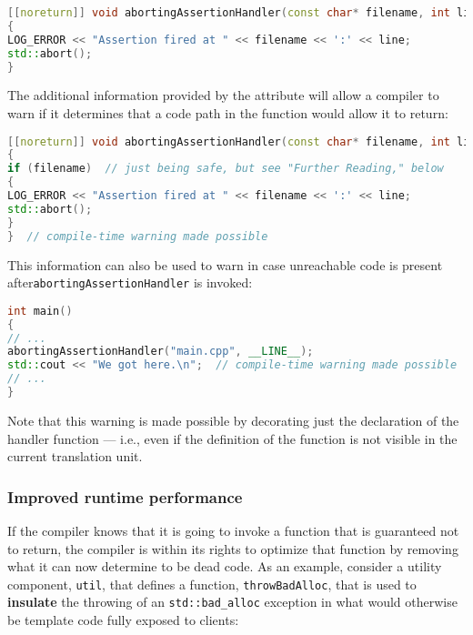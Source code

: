 \begin{lstlisting}[language=C++]
[[noreturn]] void abortingAssertionHandler(const char* filename, int line)
{
LOG_ERROR << "Assertion fired at " << filename << ':' << line;
std::abort();
}
\end{lstlisting}


\noindent The additional information provided by the attribute will allow a
compiler to warn if it determines that a code path in the
function would allow it to return:

\begin{lstlisting}[language=C++]
[[noreturn]] void abortingAssertionHandler(const char* filename, int line)
{
if (filename)  // just being safe, but see "Further Reading," below
{
LOG_ERROR << "Assertion fired at " << filename << ':' << line;
std::abort();
}
}  // compile-time warning made possible
\end{lstlisting}


\noindent This information can also be used to warn in case unreachable code is
present after\linebreak[4] \texttt{abortingAssertionHandler} is invoked:

\begin{lstlisting}[language=C++]
int main()
{
// ...
abortingAssertionHandler("main.cpp", __LINE__);
std::cout << "We got here.\n";  // compile-time warning made possible
// ...
}
\end{lstlisting}


\noindent Note that this warning is made possible by decorating just the
declaration of the handler function --- i.e., even if the definition of
the function is not visible in the current translation unit.

\subsubsection[Improved runtime performance]{Improved runtime performance}\label{improved-runtime-performance}

If the compiler knows that it is going to invoke a function
that is guaranteed not to return, the compiler is within its rights to optimize
that function by removing what it can now determine to be dead code. As
an example, consider a utility component, \texttt{util}, that defines a
function, \texttt{throwBadAlloc}, that is used to \textbf{insulate} the
throwing of an \texttt{std::bad\_alloc} exception in what would
otherwise be template code fully exposed to clients:

